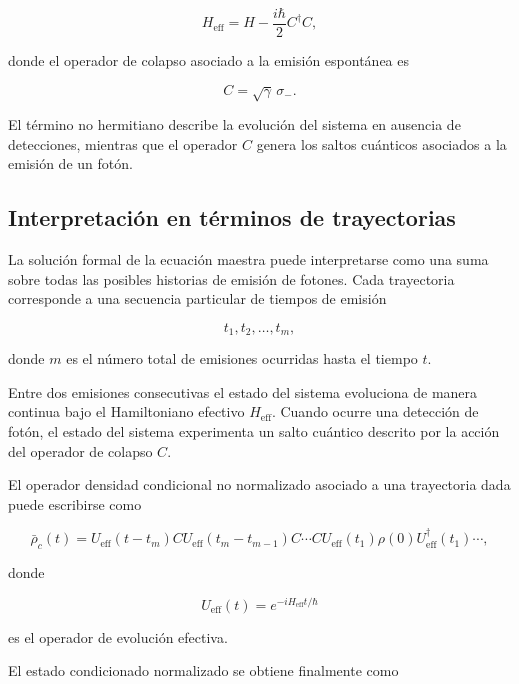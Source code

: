 \documentclass[11pt]{report}
\begin{document}
\begin{equation}
H_{\mathrm{eff}}
=
H
-
\frac{i\hbar}{2}
C^\dagger C ,
\end{equation}

donde el operador de colapso asociado a la emisión espontánea es

\begin{equation}
C = \sqrt{\gamma}\,\sigma_- .
\end{equation}

El término no hermitiano describe la evolución del sistema en ausencia de detecciones, mientras que el operador $C$ genera los saltos cuánticos asociados a la emisión de un fotón.

\subsection{Interpretación en términos de trayectorias}

La solución formal de la ecuación maestra puede interpretarse como una suma sobre todas las posibles historias de emisión de fotones. Cada trayectoria corresponde a una secuencia particular de tiempos de emisión

\[
t_1, t_2, \ldots , t_m ,
\]

donde $m$ es el número total de emisiones ocurridas hasta el tiempo $t$.

Entre dos emisiones consecutivas el estado del sistema evoluciona de manera continua bajo el Hamiltoniano efectivo $H_{\mathrm{eff}}$. Cuando ocurre una detección de fotón, el estado del sistema experimenta un salto cuántico descrito por la acción del operador de colapso $C$.

El operador densidad condicional no normalizado asociado a una trayectoria dada puede escribirse como

\begin{equation}
\bar{\rho}_c(t)
=
U_{\mathrm{eff}}(t-t_m)
C
U_{\mathrm{eff}}(t_m-t_{m-1})
C
\cdots
C
U_{\mathrm{eff}}(t_1)
\rho(0)
U_{\mathrm{eff}}^\dagger(t_1)
\cdots ,
\end{equation}

donde

\begin{equation}
U_{\mathrm{eff}}(t)=
e^{-iH_{\mathrm{eff}}t/\hbar}
\end{equation}

es el operador de evolución efectiva.

El estado condicionado normalizado se obtiene finalmente como
\end{document}
